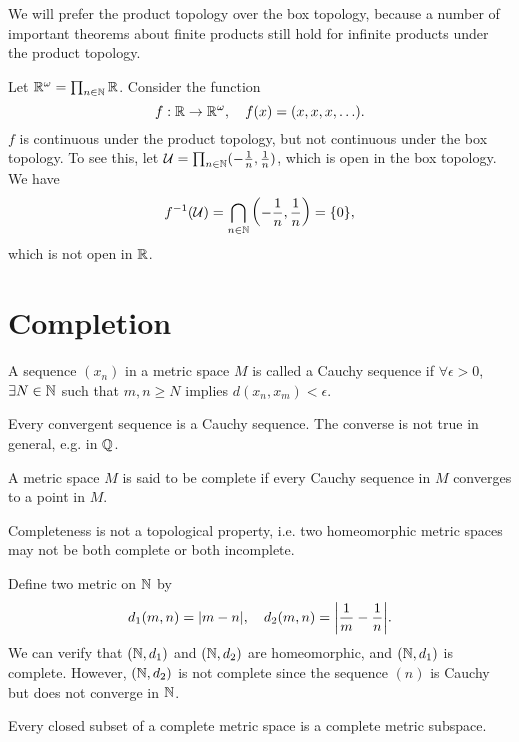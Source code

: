 We will prefer the product topology over the box topology, because a number of important theorems about finite products still hold for infinite products under the product topology.

\begin{ex}
    Let ${\mathbb R}^\omega = \prod_{n\in{\mathbb N}} {\mathbb R}$. Consider the function
    \[
    f: {\mathbb R} \to {\mathbb R}^\omega, \quad f(x) = (x, x, x, \ldots).
    \]
    $f$ is continuous under the product topology, but not continuous under the box topology. To see this, let $\mathcal U = \prod_{n\in{\mathbb N}} (-\frac1n, \frac1n)$, which is open in the box topology. We have
    \[
    f^{-1}(\mathcal U) = \bigcap_{n\in{\mathbb N}} \left(-\frac1n, \frac1n\right) = {\left\{{0}\right\}},
    \]
    which is not open in ${\mathbb R}$.
\end{ex}

\section{Completion}

\begin{df}
    A sequence $(x_n)$ in a metric space $M$ is called a Cauchy sequence if $\forall \epsilon > 0$, $\exists N\in {\mathbb N}$ such that $m, n \geq N$ implies $d(x_n, x_m) < \epsilon$.
\end{df}

Every convergent sequence is a Cauchy sequence. The converse is not true in general, e.g. in ${\mathbb Q}$.

\begin{df}
    A metric space $M$ is said to be complete if every Cauchy sequence in $M$ converges to a point in $M$.
\end{df}

Completeness is not a topological property, i.e. two homeomorphic metric spaces may not be both complete or both incomplete.

\begin{ex}
    Define two metric on ${\mathbb N}$ by
    \[
    d_1(m, n) = |m - n|, \quad d_2(m, n) = {\left| \frac1m - \frac1n \right|}.
    \]
    We can verify that $({\mathbb N}, d_1)$ and $({\mathbb N}, d_2)$ are homeomorphic, and $({\mathbb N}, d_1)$ is complete. 
    However, $({\mathbb N}, d_2)$ is not complete since the sequence $(n)$ is Cauchy but does not converge in ${\mathbb N}$.
\end{ex}

\begin{prop}
    Every closed subset of a complete metric space is a complete metric subspace.
\end{prop}

